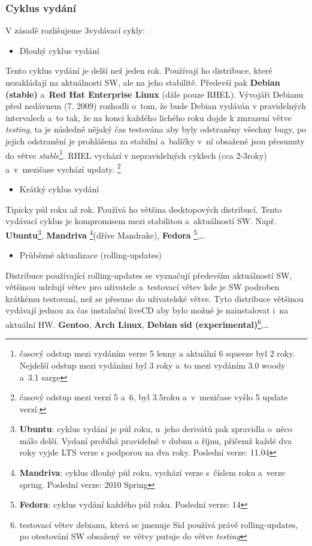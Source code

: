 \documentclass[a4paper,12pt]{article}
\renewcommand{\b}[1]{\textbf{#1}} %
\renewcommand{\it}[1]{\textit{#1}}		%
\begin{document}
\subsubsection{Cyklus vydání}
V zásadě rozlišujeme 3vydávací cykly:
\begin{itemize}
 \item Dlouhý cyklus vydání
\end{itemize}
Tento cyklus vydání je delší než jeden rok. Používají ho distribuce, které nezakládají na aktuálnosti SW, ale na jeho stabilitě. Předevší pak \b{Debian (stable)} a~\b{Red Hat Enterprise Linux} (dále pouze RHEL). Vývojáři Debianu před nedávnem (7. 2009) rozhodli o~tom, že bude Debian vydáván v pravidelných intervalech a~to tak, že na konci každého lichého roku dojde k zmrazení větve \it{testing}, ta je následně nějaký čas testována aby byly odstraněny všechny bugy, po jejich odstranění je prohlášena za stabilní a~balíčky v~ní obsažené jsou přesunuty do větve \it{stable}\footnote{časový odstup mezi vydáním verze 5 lenny a aktuální 6 squeeze byl 2 roky. Nejdelší odstup mezi vydáními byl 3 roky a~to mezi vydáním 3.0 woody a~3.1 sarge}. RHEL vychází v nepravidelných cyklech (cca 2-3roky) a~v~mezičase vychází updaty. \footnote{časový odstup mezi verzí 5 a~6, byl 3.5roku a~v~mezičase vyšlo 5 update verzí.}
\begin{itemize}
 \item Krátký cyklus vydání
\end{itemize}
Tipicky půl roku až rok. Používá ho většina desktopových distribucí. Tento vydávací cyklus je kompromisem mezi stabilitou a~aktuálností SW. Např. \b{Ubuntu}\footnote{\b{Ubuntu}: cyklus vydání je půl roku, u~jeho derivátů pak zpravidla o~něco málo delší. Vydaní probíhá pravidelně v dubnu a říjnu, přičemž každé dva roky vyjde LTS verze s podporou na dva roky. Poslední verze: 11.04}, \b{Mandriva} \footnote{\b{Mandriva}: cyklus dlouhý půl roku, vychází verze s~číslem roku a~verze spring. Poslední verze: 2010 Spring}(dříve Mandrake), \b{Fedora} \footnote{\b{Fedora}: cyklus vydání každého půl roku. Poslední verze: 14},…

\begin{itemize}
 \item Průbězné aktualizace (rolling-updates)
\end{itemize}
Distribuce používající rolling-updates se vyznačují především aktuálností SW, většinou udržují větev pro uživatele a~testovací větev kde je SW podroben krátkému testovaní, než se přesune do uživatelské větve. Tyto distribuce většinou vydávají jednou za čas instalační liveCD aby bylo možné je nainstalovat i~na aktuální HW. \b{Gentoo}, \b{Arch Linux}, \b{Debian sid (experimental)}\footnote{testovací větev debianu, která se jmenuje Sid používá právě rolling-updates, po otestování SW obsažený ve větvy putuje do větve \it{testing}},…
\end{document}
